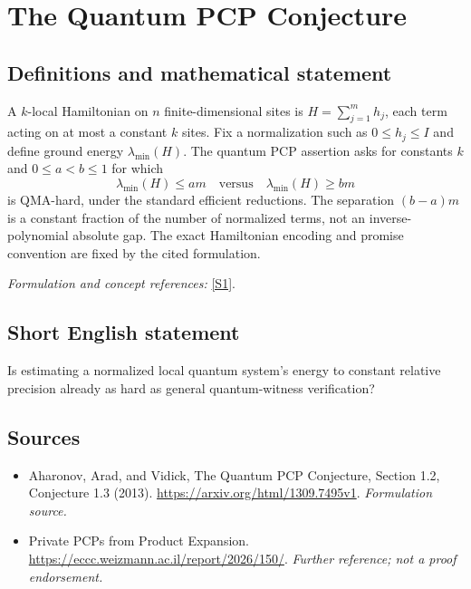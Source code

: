 \documentclass[11pt]{article}
\begin{document}
\section*{\texorpdfstring{The Quantum PCP Conjecture}{The Quantum PCP Conjecture}}\label{30006691}
\subsection{Definitions and mathematical statement}
A $k$-local Hamiltonian on $n$ finite-dimensional sites is $H=\sum_{j=1}^m h_j$, each term acting on at most a constant $k$ sites. Fix a normalization such as $0\le h_j\le I$ and define ground energy $\lambda_{\min}(H)$. The quantum PCP assertion asks for constants $k$ and $0\le a<b\le1$ for which
\[
 \lambda_{\min}(H)\le am\quad\text{versus}\quad\lambda_{\min}(H)\ge bm
\]
is QMA-hard, under the standard efficient reductions. The separation $(b-a)m$ is a constant fraction of the number of normalized terms, not an inverse-polynomial absolute gap. The exact Hamiltonian encoding and promise convention are fixed by the cited formulation.
\par\smallskip\textit{Formulation and concept references:} \href{https://arxiv.org/html/1309.7495v1}{[S1]}.

\subsection{Short English statement}
Is estimating a normalized local quantum system's energy to constant relative precision already as hard as general quantum-witness verification?
\subsection{Sources}
\begin{itemize}
\item[S1]Aharonov, Arad, and Vidick, The Quantum PCP Conjecture, Section 1.2, Conjecture 1.3 (2013).
\url{https://arxiv.org/html/1309.7495v1}.
\textit{Formulation source.}
\item[S2]Private PCPs from Product Expansion.
\url{https://eccc.weizmann.ac.il/report/2026/150/}.
\textit{Further reference; not a proof endorsement.}
\end{itemize}
\end{document}
